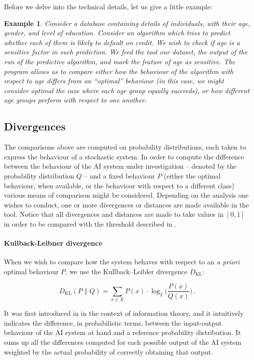 \documentclass[
]{ceurart}
\newtheorem{example}{Example}
\begin{document}
Before we delve into the technical details, let us give a little example: 

\begin{example}
Consider a database containing details of individuals, with their age, gender, and level of education. Consider an algorithm which tries to predict whether each of them is likely to default on credit. We wish to check if age is a sensitive factor in such prediction. We feed the tool our dataset, the output of the run of the predictive algorithm, and mark the feature of age as sensitive. The program allows us to compare either how the behaviour of the algorithm with respect to age differs from an ``optimal'' behaviour (in this case, we might consider optimal the case where each age group equally succeeds), or how different age groups perform with respect to one another.
\end{example}
 
\subsection{Divergences}
The comparisons above are computed on probability distributions, each taken to express the behaviour of a stochastic system. In order to compute the difference between the behaviour of the AI system under investigation -- denoted by the probability distribution $Q$ -- and a fixed behaviour $P$ (either the optimal behaviour, when available, or the behaviour with respect to a different class) various means of comparison might be considered. Depending on the analysis one wishes to conduct, one or more divergences or distances are made available in the tool. Notice that all divergences and distances are made to take values in $[0,1]$ in order to be compared with the threshold described in .


\paragraph{Kullback-Leibner divergence}
When we wish to compare how the system behaves with respect to an \textit{a priori} optimal behaviour $P$, we use the Kullback–Leibler divergence $D_{\mathrm{KL}}$:

\[D_{\mathrm{KL}}(P\parallel Q)= \sum _{x\in X} P(x)\cdot \log_2 \Big( \frac{P(x)}{Q(x)}\Big)\,.\]

It was first introduced in \cite{dkl} in the context of information theory, and it intuitively indicates the difference, in probabilistic terms, between the input-output behaviour of the AI system at hand and a reference probability distribution. It sums up all the differences computed for each possible output of the AI system weighted by the actual probability of correctly obtaining that output.
\end{document}
